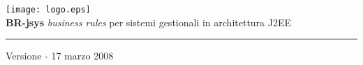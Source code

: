 
\begin{titlepage}\begin{center}
\vspace*{0.5in}
\texttt{[image: logo.eps]}
\vspace*{0.2in} \\
{\Large \textbf{BR-jsys}}
{\Large \emph{business rules} per sistemi gestionali in architettura J2EE } 
\vspace{2in} \\
\Huge \textsc{ \dt }
\par\rule{10cm}{0.4pt} \par {\large Versione \lv - 17 marzo 2008} \\
\end{center}\end{titlepage}

\vspace*{0.5in}